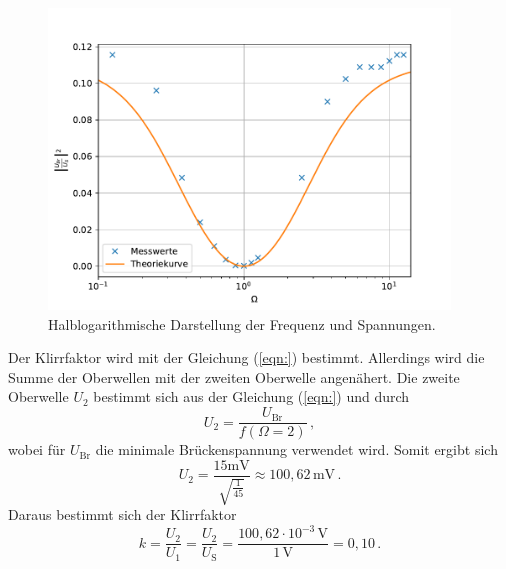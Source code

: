 \begin{figure}[H]
  \centering
  \includegraphics[width=0.95\textwidth]{plot.pdf}
  \caption{Halblogarithmische Darstellung der Frequenz und Spannungen.}
  \label{fig:WienRobinson}
\end{figure}
Der Klirrfaktor wird mit der Gleichung (\ref{eqn:}) bestimmt. Allerdings wird die Summe der Oberwellen mit der zweiten Oberwelle angenähert.
Die zweite Oberwelle $U_2$ bestimmt sich aus der Gleichung (\ref{eqn:}) und durch
$$U_2 = \frac{U_{\text{Br}}}{f(\Omega = 2)}\,,$$
wobei für $U_{\text{Br}}$ die minimale Brückenspannung verwendet wird. Somit ergibt sich 
$$U_2 = \frac{15\unit{\milli\volt}}{\sqrt{\frac{1}{45}}} \approx 100,62\,\unit{\milli\volt}\,.$$
Daraus bestimmt sich der Klirrfaktor
$$k = \frac{U_2}{U_1} = \frac{U_2}{U_{\text{S}}}= \frac{100,62 \cdot 10^{-3}\,\unit{\volt}}{1\,\unit{\volt}} = 0,10\,.$$